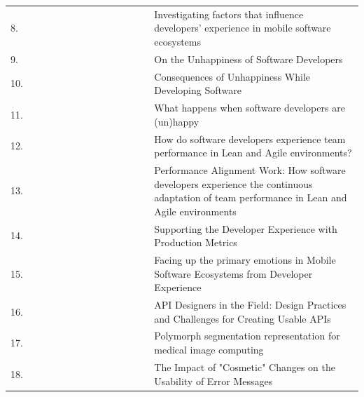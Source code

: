 \documentclass[english, 12pt, a4paper, sci, utf8, a-1b, online]{aaltothesis}
\begin{document}
\begin{center}
\begin{longtable}{p{0.05\linewidth}p{0.35\linewidth}p{0.6\linewidth}}
    8.  & \textcite{fontao2017investigating}                    & Investigating factors that influence developers' experience in mobile software ecosystems                                                   \\
    9.  & \textcite{on-the-unhappiness}                         & On the Unhappiness of Software Developers                                                                                                   \\
    10. & \textcite{consequences-of-unhappiness}                & Consequences of Unhappiness While Developing Software                                                                                       \\
    11. & \textcite{what-happens-when-unhappy}                  & What happens when software developers are (un)happy                                                                                         \\
    12. & \textcite{how-developers-experience-team-performance} & How do software developers experience team performance in Lean and Agile environments?                                                      \\
    13. & \textcite{paw}                                        & Performance Alignment Work: How software developers experience the continuous adaptation of team performance in Lean and Agile environments \\
    14. & \textcite{chatley2019supporting}                      & Supporting the Developer Experience with Production Metrics                                                                                 \\
    15. & \textcite{fontao2017facing}                           & Facing up the primary emotions in Mobile Software Ecosystems from Developer Experience                                                      \\
    16. & \textcite{api-designers}                              & API Designers in the Field: Design Practices and Challenges for Creating Usable APIs                                                        \\
    17. & \textcite{pinter2019polymorph}                        & Polymorph segmentation representation for medical image computing                                                                           \\
    18. & \textcite{dong2019impact}                             & The Impact of "Cosmetic" Changes on the Usability of Error Messages                                                                         \\

\end{longtable}
\end{center}
\end{document}
